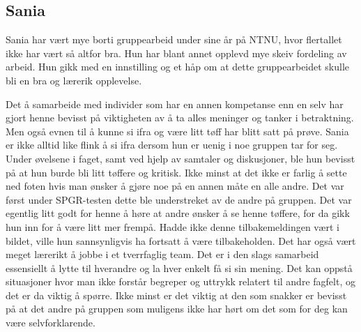 \documentclass[a4paper,norsk,oneside]{article}
\begin{document}
\subsection{Sania}
Sania har vært mye borti gruppearbeid under sine år på NTNU, hvor flertallet ikke har vært så altfor bra. Hun har blant annet opplevd mye skeiv fordeling av arbeid. Hun gikk med en innstilling og et håp om at dette gruppearbeidet skulle bli en bra og lærerik opplevelse. 

Det å samarbeide med individer som har en annen kompetanse enn en selv har gjort henne bevisst på viktigheten av å ta alles meninger og tanker i betraktning. Men også evnen til å kunne si ifra og være litt tøff har blitt satt på prøve. Sania er ikke alltid like flink å si ifra dersom hun er uenig i noe gruppen tar for seg.  Under øvelsene i faget, samt ved hjelp av samtaler og diskusjoner, ble hun bevisst på at hun burde bli litt tøffere og kritisk. Ikke minst at det ikke er farlig å sette ned foten hvis man ønsker å gjøre noe på en annen måte en alle andre. Det var først under SPGR-testen dette ble understreket av de andre på gruppen. Det var egentlig litt godt for henne å høre at andre ønsker å se henne tøffere, for da gikk hun inn for å være litt mer frempå. Hadde ikke denne tilbakemeldingen vært i bildet, ville hun sannsynligvis ha fortsatt å være tilbakeholden. 
Det har også vært meget lærerikt å jobbe i et tverrfaglig team. Det er i den slags samarbeid essensiellt å lytte til hverandre og la hver enkelt få si sin mening. Det kan oppstå situasjoner hvor man ikke forstår begreper og uttrykk relatert til andre fagfelt, og det er da viktig å spørre. Ikke minst er det viktig at den som snakker er bevisst på at det andre på gruppen som muligens ikke har hørt om det som for deg kan være selvforklarende.     
\end{document}

